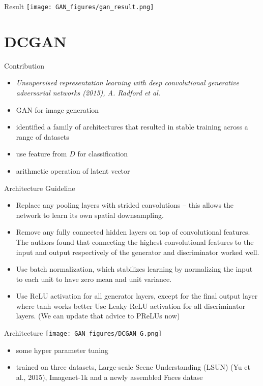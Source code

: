 \documentclass[9pt]{beamer}
\begin{document}
\begin{frame}{Result}
  \texttt{[image: GAN\_figures/gan\_result.png]}
\end{frame}

\section{DCGAN}

\begin{frame}{Contribution}
  \begin{itemize}
  \item \emph{Unsupervised representation learning with deep convolutional generative adversarial networks (2015), A. Radford et al.}
  \item GAN for image generation
  \item identified a family of architectures that resulted in stable
    training across a range of datasets
  \item use feature from $D$ for classification
  \item arithmetic operation of latent vector
  \end{itemize}
\end{frame}

\begin{frame}{Architecture Guideline}
  \small{
  \begin{itemize}
  \item Replace any pooling layers with strided convolutions – this
    allows the network to learn its own spatial downsampling.
  \item 
    Remove any fully connected hidden layers on top of convolutional
    features. The authors found that connecting the highest convolutional
    features to the input and output respectively of the generator and
    discriminator worked well.
  \item 
    Use batch normalization, which stabilizes learning by normalizing the
    input to each unit to have zero mean and unit variance.
  \item 
    Use ReLU activation for all generator layers, except for the final
    output layer where tanh works better Use Leaky ReLU activation for all
    discriminator layers. (We can update that advice to PReLUs now)
  \end{itemize}}
\end{frame}

\begin{frame}{Architecture}
  \texttt{[image: GAN\_figures/DCGAN\_G.png]}
  \begin{itemize}
  \item some hyper parameter tuning
  \item trained on three datasets, Large-scale Scene Understanding (LSUN) (Yu et al., 2015),
Imagenet-1k and a newly assembled Faces datase
  \end{itemize}
\end{frame}
\end{document}
